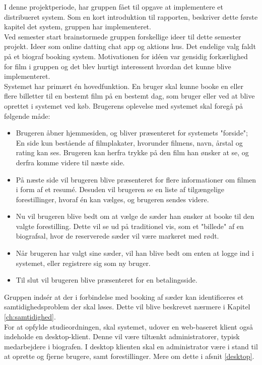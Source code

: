 I denne projektperiode, har gruppen fået til opgave at implementere et distribueret system. Som en kort introduktion til rapporten, beskriver dette første kapitel det system,
gruppen har implementeret. \\

Ved semester start brainstormede gruppen forskellige ideer til dette semester projekt. 
Ideer som online datting chat app og aktions hus. 
Det endelige valg faldt på et biograf booking system.
Motivationen for idéen var gensidig forkærlighed for film i gruppen 
og det blev hurtigt interessent hvordan det kunne blive implementeret. \\

Systemet har primært én hovedfunktion. En bruger skal kunne booke en eller flere billetter 
til en bestemt film på en bestemt dag, som bruger eller ved at blive oprettet i systemet ved køb.
Brugerens oplevelse med systemet skal foregå på følgende måde:

\begin{itemize}
    \item Brugeren åbner hjemmesiden, og bliver præsenteret for systemets "forside"; En side kun bestående af filmplakater, hvorunder filmens, navn, årstal og rating kan ses. Brugeren kan herfra trykke på den film han ønsker at se, og derfra komme videre til næste side.
    \item På næste side vil brugeren blive præsenteret for flere informationer om filmen i form af et resumé. Desuden vil brugeren se en liste af tilgængelige forestillinger, hvoraf én kan vælges, og brugeren sendes videre.
    \item Nu vil brugeren blive bedt om at vælge de sæder han ønsker at booke til den valgte forestilling. Dette vil se ud på traditionel vis, som et "billede" af en biografsal, hvor de reserverede sæder vil være markeret med rødt.
    \item Når brugeren har valgt sine sæder, vil han blive bedt om enten at logge ind i systemet, eller registrere sig som ny bruger.
    \item Til slut vil brugeren blive præsenteret for en betalingsside.
\end{itemize}

Gruppen indsér at der i forbindelse med booking af sæder kan identificeres et samtidighedsproblem der skal løses. Dette vil blive beskrevet nærmere i Kapitel \ref{ch:samtidighed}. \\

For at opfylde studieordningen, skal systemet, udover en web-baseret klient også indeholde en desktop-klient. Denne vil være tiltænkt administratorer, typisk medarbejdere i biografen.
I desktop klienten skal en administrator være i stand til at oprette og fjerne brugere, samt forestillinger. Mere om dette i afsnit \ref{desktop}.